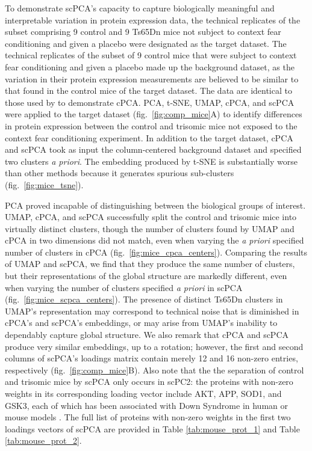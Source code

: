 To demonstrate scPCA's capacity to capture biologically meaningful and interpretable variation in protein expression data, the technical replicates of the subset comprising 9 control and 9 Ts65Dn mice not subject to context fear conditioning and given a placebo were designated as the target dataset. The technical replicates of the subset of 9 control mice that were subject to context fear conditioning and given a placebo made up the background dataset, as the variation in their protein expression measurements are believed to be similar to that found in the control mice of the target dataset. The data are identical to those used by \citet{Abid2018} to demonstrate cPCA. PCA, t-SNE, UMAP, cPCA, and scPCA were applied to the target dataset (fig.~\ref{fig:comp_mice}A) to identify differences in protein expression between the control and trisomic mice not exposed to the context fear conditioning experiment. In addition to the target dataset, cPCA and scPCA took as input the column-centered background dataset and specified two clusters \textit{a priori}. The embedding produced by t-SNE is substantially worse than other methods because it generates spurious sub-clusters (fig.~\ref{fig:mice_tsne}).

PCA proved incapable of distinguishing between the biological groups of interest. UMAP, cPCA, and scPCA successfully split the control and trisomic mice into virtually distinct clusters, though the number of clusters found by UMAP and cPCA in two dimensions did not match, even when varying the \textit{a priori} specified number of clusters in cPCA (fig.~\ref{fig:mice_cpca_centers}). Comparing the results of UMAP and scPCA, we find that they produce the same number of clusters, but their representations of the global structure are markedly different, even when varying the number of clusters specified \textit{a priori} in scPCA (fig.~\ref{fig:mice_scpca_centers}). The presence of distinct Ts65Dn clusters in UMAP's representation may correspond to technical noise that is diminished in cPCA's and scPCA's embeddings, or may arise from UMAP's inability to dependably capture global structure. We also remark that cPCA and scPCA produce very similar embeddings, up to a rotation; however, the first and second columns of scPCA's loadings matrix contain merely 12 and 16 non-zero entries, respectively (fig.~\ref{fig:comp_mice}B). Also note that the the separation of control and trisomic mice by scPCA only occurs in scPC2: the proteins with non-zero weights in its corresponding loading vector include AKT, APP, SOD1, and GSK3, each of which has been associated with Down Syndrome in human or mouse models \cite{Troca-Marn9445,Niceta2015,Gulesserian2001,Isacson2002}.  The full list of proteins with non-zero weights in the first two loadings vectors of scPCA are provided in Table \ref{tab:mouse_prot_1} and  Table \ref{tab:mouse_prot_2}.

